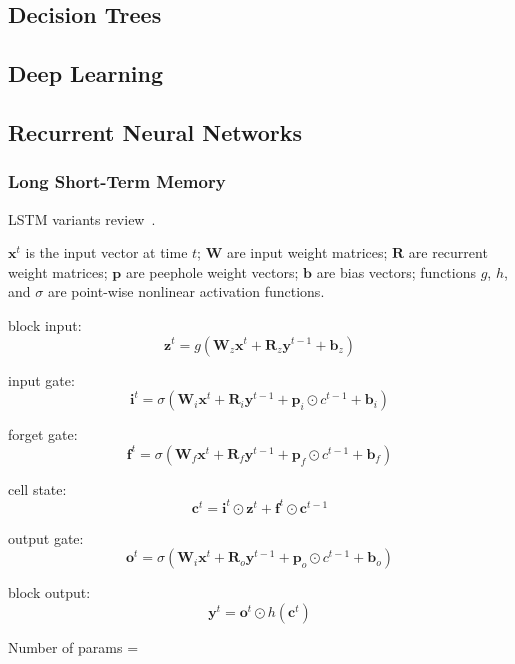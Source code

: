 \subsection{Decision Trees}

\subsection{Deep Learning}

\subsection{Recurrent Neural Networks}


\subsubsection{Long Short-Term Memory}

LSTM variants review~\cite{Greff2015}.

$\bm{x}^t$ is the input vector at time $t$; $\bm{W}$ are input weight matrices; $\bm{R}$ are recurrent weight matrices; $\bm{p}$ are peephole weight vectors; $\bm{b}$ are bias vectors; functions $g$, $h$, and $\sigma$ are point-wise nonlinear activation functions.

block input:
\[ \bm{z}^{t} = g \left( \bm{W}_z \bm{x}^t + \bm{R}_z \bm{y}^{t - 1} + \bm{b}_z \right) \]

input gate:
\[ \bm{i}^{t} = \sigma \left( \bm{W}_i \bm{x}^t + \bm{R}_i \bm{y}^{t-1} + \bm{p}_i \odot c^{t-1} + \bm{b}_i \right) \]

forget gate:
\[ \bm{f}^{t} = \sigma \left( \bm{W}_f \bm{x}^t + \bm{R}_f \bm{y}^{t-1} + \bm{p}_f \odot c^{t-1} + \bm{b}_f \right) \]

cell state:
\[ \bm{c}^t = \bm{i}^t \odot \bm{z}^t + \bm{f}^t \odot \bm{c}^{t-1} \]

output gate:
\[ \bm{o}^{t} = \sigma \left( \bm{W}_i \bm{x}^t + \bm{R}_o \bm{y}^{t - 1} + \bm{p}_o \odot c^{t-1} + \bm{b}_o \right) \]

block output:
\[ \bm{y}^t = \bm{o}^t \odot h(\bm{c}^t) \]

Number of params = \todo[inline]{\ldots}



